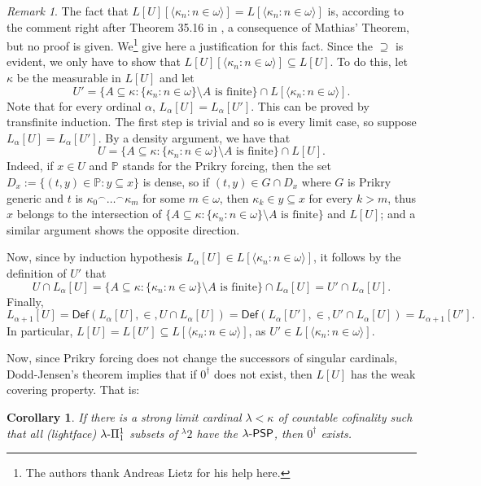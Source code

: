\documentclass{amsart}
\numberwithin{equation}{section}
\def\hyp{{\hbox{-}}}
\newtheorem{corollary}[theorem]{Corollary}
\theoremstyle{definition}
\theoremstyle{remark}
\newtheorem{remark}[theorem]{Remark}
\begin{document}
\begin{remark}The fact that $L[U][\langle \kappa_n:n\in\omega\rangle]=L[\langle\kappa_n:n\in\omega\rangle]$ is, according to the comment right after Theorem 35.16 in \cite{Jech}, a consequence of Mathias' Theorem, but no proof is given. We\footnote{The authors thank Andreas Lietz for his help here.} give here a justification for this fact. Since the $\supseteq$ is evident, we only have to show that $L[U][\langle\kappa_n:n\in\omega\rangle]\subseteq L[U]$. To do this, let $\kappa$ be the measurable in $L[U]$ and let 
\[
U'=\{A\subseteq\kappa:\{\kappa_n:n\in\omega\}\setminus A\text{ is finite}\}\cap L[\langle\kappa_n:n\in\omega\rangle].
\] 
Note that for every ordinal $\alpha$, $L_{\alpha}[U]=L_{\alpha}[U']$. This can be proved by transfinite induction. The first step is trivial and so is every limit case, so suppose $L_\alpha[U]=L_{\alpha}[U']$. By a density argument, we have that \[U=\{A\subseteq\kappa:\{\kappa_n:n\in\omega\}\setminus A\text{ is finite}\}\cap L[U].\] Indeed, if $x\in U$ and $\mathbb{P}$ stands for the Prikry forcing, then the set $D_{x}:=\{(t,y)\in\mathbb{P}:y\subseteq x\}$ is dense, so if $(t,y)\in G\cap D_{x}$ where $G$ is Prikry generic and $t$ is $\kappa_0{}^{\smallfrown}\ldots{}^{\smallfrown}\kappa_m$ for some $m\in\omega$, then $\kappa_k\in y\subseteq x$ for every $k>m$, thus $x$ belongs to the intersection of $\{A\subseteq\kappa:\{\kappa_n:n\in\omega\}\setminus A\text{ is finite}\}$ and $L[U]$; and a similar argument shows the opposite direction. 

Now, since by induction hypothesis $L_{\alpha}[U]\in L[\langle\kappa_n:n\in\omega\rangle]$, it follows by the definition of $U'$ that 
\[
U\cap L_{\alpha}[U]=\{A\subseteq\kappa:\{\kappa_n:n\in\omega\}\setminus A\text{ is finite}\}\cap L_{\alpha}[U]=U'\cap L_{\alpha}[U].
\]
Finally, \[
L_{\alpha+1}[U]=\mathsf{Def}(L_{\alpha}[U],\in,U\cap L_{\alpha}[U])=\mathsf{Def}(L_{\alpha}[U'],\in,U'\cap L_{\alpha}[U])=L_{\alpha+1}[U'].
\]
In particular, $L[U]=L[U']\subseteq L[\langle\kappa_n:n\in\omega\rangle]$, as $U'\in L[\langle\kappa_n:n\in\omega\rangle]$.
\end{remark}

Now, since Prikry forcing does not change the successors of singular cardinals, Dodd-Jensen's theorem implies that if $0^\dagger$ does not exist, then $L[U]$ has the weak covering property. That is:

\begin{corollary}\label{corollary:all-lightface-pi-1-1-then-0-dagger}
	If there is a strong limit cardinal $\lambda<\kappa$ of countable cofinality such that all (lightface) $\lambda\hyp\Pi^1_1$ subsets of ${}^{\lambda}2$ have the $\lambda\hyp\mathsf{PSP}$, then $0^{\dagger}$ exists. 
\end{corollary}
\end{document}
